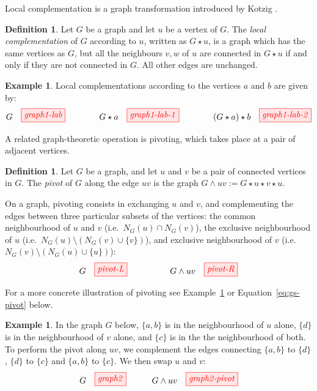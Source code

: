 \documentclass[a4paper,onecolumn,superscriptaddress,11pt,accepted=2020-04-27]{quantumarticle}
\theoremstyle{definition}
\newtheorem{definition}[theorem]{Definition}
\newtheorem{example}[theorem]{Example}
\begin{document}
Local complementation is a graph transformation introduced by
Kotzig \cite{kotzig}.
\begin{definition}
  Let $G$ be a %
  graph and let $u$ be a vertex of $G$. 
  The \emph{local complementation} of $G$ according to $u$, 
  written as $G\star u$, is a graph which has the same vertices as $G$, 
  but all the neighbours $v,w$ of $u$ are connected in $G\star u$ if and only if
  they are not connected in $G$. %
  All other edges are unchanged.
\end{definition}

\begin{example} Local complementations according to the vertices $a$ and $b$ are given by:
\begin{equation*}
G\quad\tikzfig{graph1-lab}\qquad\qquad G\star a\quad\tikzfig{graph1-lab-1}\qquad\qquad (G\star a) \star b\quad\tikzfig{graph1-lab-2}
\end{equation*}
\end{example}

A related graph-theoretic operation is pivoting, which takes place at a pair of adjacent vertices.
\begin{definition}
  Let $G$ be a %
  graph, and let $u$ and $v$ be a pair of connected vertices in $G$. 
  The \emph{pivot} of $G$ along the edge $uv$ is the graph $G\wedge uv := G\star u \star v \star u$.
\end{definition}
On a graph, pivoting consists in exchanging $u$ and $v$, and complementing the edges
between three particular subsets of the vertices: the common neighbourhood of $u$ and $v$ (i.e.~$N_G(u)\cap N_G(v)$), the exclusive neighbourhood of $u$ (i.e.~$N_G(u)\setminus (N_G(v)\cup \{v\})$), and exclusive neighbourhood of $v$ (i.e.~$N_G(v)\setminus (N_G(u)\cup \{u\})$):
\[G \quad\tikzfig{pivot-L}\qquad\qquad \quad G\wedge uv \quad\tikzfig{pivot-R}
\]

For a more concrete illustration of pivoting see Example~\ref{ex:pivot} or Equation~\eqref{eq:gs-pivot} below.
\begin{example}\label{ex:pivot}
In the graph $G$ below, $\{a, b\}$ is in the neighbourhood of $u$ alone, $\{d\}$ is in the neighbourhood of $v$ alone, and $\{c\}$ is in the the neighbourhood of both. To perform the pivot along $uv$, we complement the edges connecting $\{a, b\}$ to $\{d\}$, $\{d\}$ to $\{c\}$ and $\{a, b\}$ to $\{c\}$. We then swap $u$ and $v$:
\[
G\quad\tikzfig{graph2} \qquad \quad G\wedge uv\quad\tikzfig{graph2-pivot}
\]
\end{example}
\end{document}
